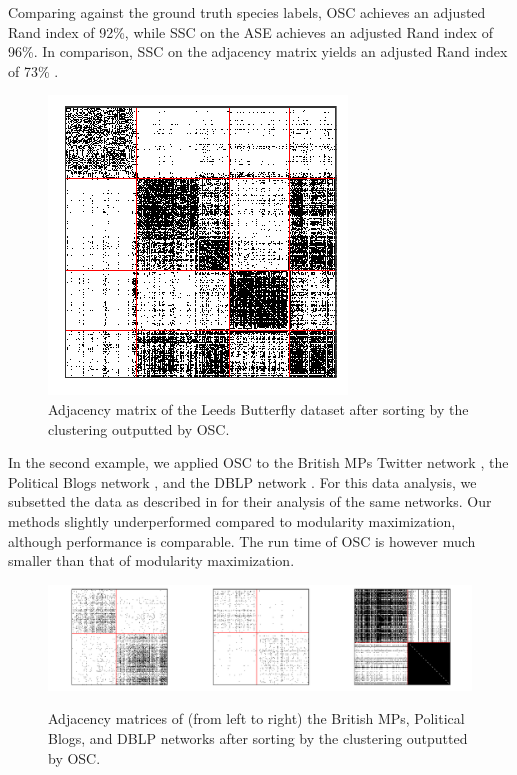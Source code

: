\documentclass[12pt]{article}
\begin{document}
Comparing against the ground truth species labels, OSC achieves an adjusted Rand index of 92\%, while SSC on the ASE achieves an adjusted Rand index of 96\%. In comparison, SSC on the adjacency matrix yields an adjusted Rand index of 73\% \citep{noroozi2019estimation}.

\begin{figure}[H]

{\centering \includegraphics{summary_files/figure-latex/butterfly-1}

}

\caption{Adjacency matrix of the Leeds Butterfly dataset 
after sorting by the clustering outputted by OSC.}\label{fig:butterfly}
\end{figure}

In the second example, we applied OSC to the British MPs Twitter network
\citep{greene2013producing}, the Political Blogs network
\citep{10.1145/1134271.1134277}, and the DBLP network
\citep{NIPS2009_3855, 10.1007/978-3-642-15880-3_42}. For this data
analysis, we subsetted the data as described in
\citet{307cbeb9b1be48299388437423d94bf1} for their analysis of the
same networks. Our methods slightly underperformed compared to modularity
maximization, although performance is comparable. The run time of OSC
is however much smaller than that of modularity maximization.

\begin{figure}[H]
{\centering \includegraphics{summary_files/figure-latex/mp-1}
}
\caption{Adjacency matrices of (from left to right) the British MPs, Political Blogs, and DBLP networks after sorting by the clustering outputted by OSC.}\label{fig:mp}
\end{figure}
\end{document}
